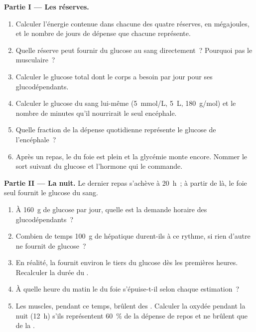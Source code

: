 \begin{problem}
\medskip
\noindent\textbf{Partie I --- Les réserves.}
\begin{enumerate}
  \item Calculer l'énergie contenue dans chacune des quatre réserves, en
        mégajoules, et le nombre de jours de dépense que chacune
        représente.
  \item Quelle réserve peut fournir du glucose au sang directement~?
        Pourquoi pas le  musculaire~?
  \item Calculer le glucose total dont le corps a besoin par jour pour
        ses  glucodépendants.
  \item Calculer le glucose du sang lui-même (\qty{5}{mmol/L},
        \qty{5}{L}, \qty{180}{g/mol}) et le nombre de minutes qu'il
        nourrirait le seul encéphale.
  \item Quelle fraction de la dépense quotidienne représente le glucose
        de l'encéphale~?
  \item Après un repas, le  du foie est plein et la glycémie
        monte encore. Nommer le sort suivant du glucose et l'hormone qui
        le commande.
\end{enumerate}

\medskip
\noindent\textbf{Partie II --- La nuit.}
Le dernier repas s'achève à 20~h~; à partir de là, le foie seul fournit
le glucose du sang.
\begin{enumerate}[resume]
  \item À \qty{160}{g} de glucose par jour, quelle est la demande
        horaire des  glucodépendants~?
  \item Combien de temps \qty{100}{g} de  hépatique durent-ils
        à ce rythme, si rien d'autre ne fournit de glucose~?
  \item En réalité, la  fournit environ le tiers du
        glucose dès les premières heures. Recalculer la durée du
        .
  \item À quelle heure du matin le  du foie s'épuise-t-il selon
        chaque estimation~?
  \item Les muscles, pendant ce temps, brûlent des .
        Calculer la  oxydée pendant la nuit (\qty{12}{h}) s'ils
        représentent \qty{60}{\%} de la dépense de repos et ne brûlent
        que de la .
\end{enumerate}


\end{problem}
